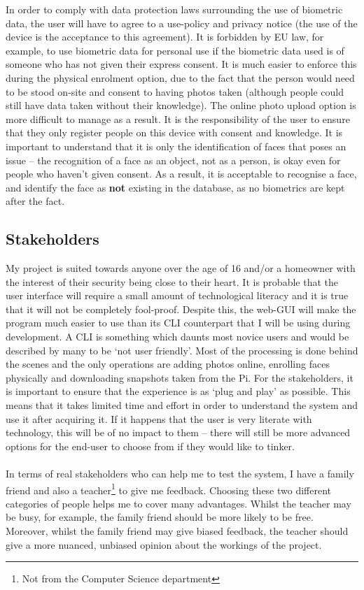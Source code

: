 \documentclass[9pt]{article}
\begin{document}
In order to comply with data protection laws surrounding the use of biometric data, the user will have to agree to a use-policy and privacy notice (the use of the device is the acceptance to this agreement). It is forbidden by EU law, for example, to use biometric data for personal use if the biometric data used is of someone who has not given their express consent. It is much easier to enforce this during the physical enrolment option, due to the fact that the person would need to be stood on-site and consent to having photos taken (although people could still have data taken without their knowledge). The online photo upload option is more difficult to manage as a result. It is the responsibility of the user to ensure that they only register people on this device with consent and knowledge. It is important to understand that it is only the identification of faces that poses an issue -- the recognition of a face as an object, not as a person, is okay even for people who haven't given consent. As a result, it is acceptable to recognise a face, and identify the face as \textbf{not} existing in the database, as no biometrics are kept after the fact.

\subsection{Stakeholders}\label{sec_stakeholders}
My project is suited towards anyone over the age of 16 and/or a homeowner with the interest of their security being close to their heart. It is probable that the user interface will require a small amount of technological literacy and it is true that it will not be completely fool-proof. Despite this, the web-GUI will make the program much easier to use than its CLI counterpart that I will be using during development. A CLI is something which daunts most novice users and would be described by many to be `not user friendly’. Most of the processing is done behind the scenes and the only operations are adding photos online, enrolling faces physically and downloading snapshots taken from the Pi. For the stakeholders, it is important to ensure that the experience is as `plug and play' as possible. This means that it takes limited time and effort in order to understand the system and use it after acquiring it. If it happens that the user is very literate with technology, this will be of no impact to them -- there will still be more advanced options for the end-user to choose from if they would like to tinker.\\\\
In terms of real stakeholders who can help me to test the system, I have a family friend and also a teacher\footnote{Not from the Computer Science department} to give me feedback. Choosing these two different categories of people helps me to cover many advantages. Whilst the teacher may be busy, for example, the family friend should be more likely to be free. Moreover, whilst the family friend may give biased feedback, the teacher should give a more nuanced, unbiased opinion about the workings of the project.
\end{document}
